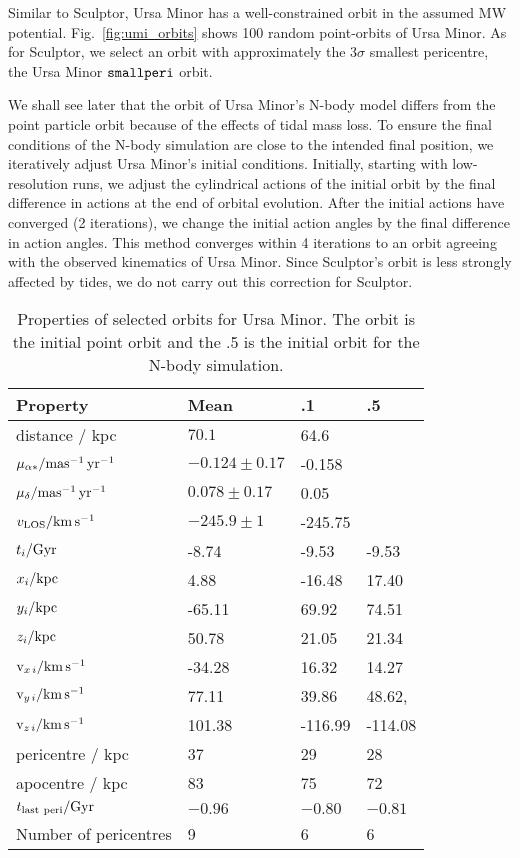 Similar to Sculptor, Ursa Minor has a well-constrained orbit in the
assumed MW potential. Fig.~\ref{fig:umi_orbits} shows 100 random
point-orbits of Ursa Minor. As for Sculptor, we select an orbit with
approximately the \(3\sigma\) smallest pericentre, the Ursa Minor
\({\tt smallperi}{}\) orbit.

We shall see later that the orbit of Ursa Minor's N-body model differs
from the point particle orbit because of the effects of tidal mass loss.
To ensure the final conditions of the N-body simulation are close to the
intended final position, we iteratively adjust Ursa Minor's initial
conditions. Initially, starting with low-resolution runs, we adjust the
cylindrical actions of the initial orbit by the final difference in
actions at the end of orbital evolution. After the initial actions have
converged (2 iterations), we change the initial action angles by the
final difference in action angles. This method converges within 4
iterations to an orbit agreeing with the observed kinematics of Ursa
Minor. Since Sculptor's orbit is less strongly affected by tides, we do
not carry out this correction for Sculptor.

\begin{table*}[t]
\centering
\caption[Ursa Minor Selected Orbits]{Properties of selected orbits for Ursa Minor. The \smallperi{} orbit is the initial point orbit and the \smallperi{}.5 is the initial orbit for the N-body simulation. }
\label{tbl:umi_orbits}
\begin{tabular}{llll}
\toprule
Property & Mean & \smallperi{}.1 & \smallperi{}.5\\
\midrule
distance / kpc & $70.1$ & 64.6 & \\
$\mu_{\alpha*} / {\rm mas^{-1}\,yr^{-1}}$ & $-0.124 \pm 0.17$ & -0.158 & \\
$\mu_{\delta} / {\rm mas^{-1}\,yr^{-1}}$ & $0.078\pm0.17$ & 0.05 & \\
$v_{\rm LOS} / {\rm km\,s^{-1}}$ & $-245.9\pm 1$ & -245.75 & \\
$t_i / {\rm Gyr}$ & -8.74 & -9.53 & -9.53\\
${x}_{i} / {\rm kpc}$ & 4.88 & -16.48 & 17.40\\
${y}_{i} / {\rm kpc}$ & -65.11 & 69.92 & 74.51\\
${z}_{i} / {\rm kpc}$ & 50.78 & 21.05 & 21.34\\
${\rm v}_{x\,i} / {\rm km\,s^{-1}}$ & -34.28 & 16.32 & 14.27\\
${\rm v}_{y\,i} / {\rm km\,s^{-1}}$ & 77.11 & 39.86 & 48.62,\\
${\rm v}_{z\,i} / {\rm km\,s^{-1}}$ & 101.38 & -116.99 & -114.08\\
pericentre / kpc & 37 & 29 & 28\\
apocentre / kpc & 83 & 75 & 72\\
$t_{\rm last\ peri} / \Gyr$ & $-0.96$ & $-0.80$ & $-0.81$\\
Number of pericentres & 9 & 6 & 6\\
\bottomrule
\end{tabular}
\end{table*}

